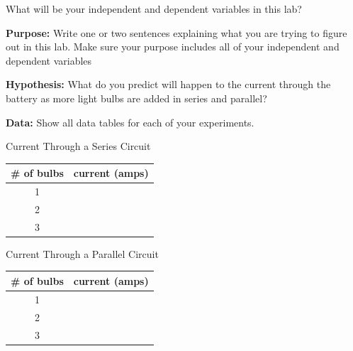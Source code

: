 \documentclass[10pt]{exam}
\begin{document}
\begin{questions}

  \question
    What will be your independent and dependent variables in this lab? \vs 
  
  \question
    \textbf{Purpose:} Write one or two sentences explaining what you are trying to figure out in this lab.  Make sure your purpose includes all of your independent and dependent variables \vs

  \question
    \textbf{Hypothesis:} What do you predict will happen to the current through the battery as more light bulbs are added in series and parallel? \vs

  \pagebreak

  \question
    \textbf{Data:} Show all data tables for each of your experiments.  

    \renewcommand{\arraystretch}{2}

    \begin{multicols}{2}
      Current Through a Series Circuit

      \begin{tabular}{|c|c|}
        \hline
        \# of bulbs & current (amps) \\\hline
        1 &\\\hline
        2 &\\\hline
        3 &\\\hline
      \end{tabular}

      Current Through a Parallel Circuit

      \begin{tabular}{|c|c|}
        \hline
        \# of bulbs & current (amps) \\\hline
        1 &\\\hline
        2 &\\\hline
        3 &\\\hline
      \end{tabular}


\end{multicols}
\end{questions}
\end{document}
